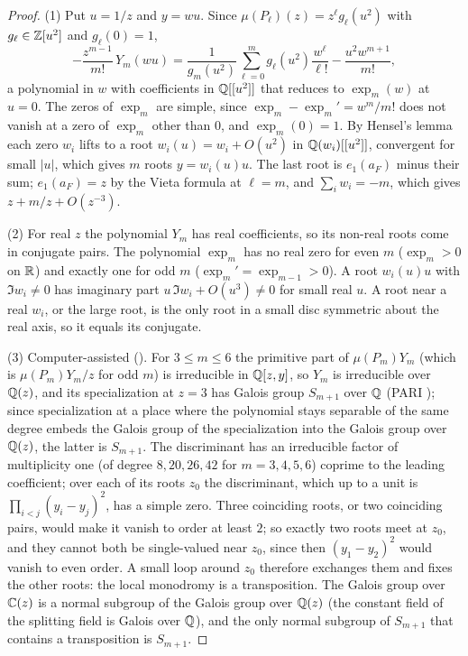 \begin{proof}
(1) Put $u=1/z$ and $y=wu$. Since $\mu(P_\ell)(z)=z^{\ell}g_\ell(u^{2})$ with $g_\ell\in\mathbb{Z}[u^{2}]$ and $g_\ell(0)=1$,
\[
-\frac{z^{m-1}}{m!}\,Y_m(wu)=\frac{1}{g_m(u^{2})}\sum_{\ell=0}^{m}g_\ell(u^{2})\frac{w^{\ell}}{\ell!}-\frac{u^{2}w^{m+1}}{m!},
\]
a polynomial in $w$ with coefficients in $\mathbb{Q}[[u^{2}]]$ that reduces to $\exp_m(w)$ at $u=0$. The zeros of $\exp_m$ are simple, since $\exp_m-\exp_m'=w^{m}/m!$ does not vanish at a zero of $\exp_m$ other than $0$, and $\exp_m(0)=1$. By Hensel's lemma each zero $w_i$ lifts to a root $w_i(u)=w_i+O(u^{2})$ in $\mathbb{Q}(w_i)[[u^{2}]]$, convergent for small $|u|$, which gives $m$ roots $y=w_i(u)u$. The last root is $e_1(a_F)$ minus their sum; $e_1(a_F)=z$ by the Vieta formula at $\ell=m$, and $\sum_iw_i=-m$, which gives $z+m/z+O(z^{-3})$.

(2) For real $z$ the polynomial $Y_m$ has real coefficients, so its non-real roots come in conjugate pairs. The polynomial $\exp_m$ has no real zero for even $m$ ($\exp_m>0$ on $\mathbb{R}$) and exactly one for odd $m$ ($\exp_m'=\exp_{m-1}>0$). A root $w_i(u)u$ with $\Im w_i\neq0$ has imaginary part $u\,\Im w_i+O(u^{3})\neq0$ for small real $u$. A root near a real $w_i$, or the large root, is the only root in a small disc symmetric about the real axis, so it equals its conjugate.

(3) Computer-assisted (). For $3\le m\le6$ the primitive part of $\mu(P_m)Y_m$ (which is $\mu(P_m)Y_m/z$ for odd $m$) is irreducible in $\mathbb{Q}[z,y]$, so $Y_m$ is irreducible over $\mathbb{Q}(z)$, and its specialization at $z=3$ has Galois group $S_{m+1}$ over $\mathbb{Q}$ (PARI ); since specialization at a place where the polynomial stays separable of the same degree embeds the Galois group of the specialization into the Galois group over $\mathbb{Q}(z)$, the latter is $S_{m+1}$. The discriminant has an irreducible factor of multiplicity one (of degree $8,20,26,42$ for $m=3,4,5,6$) coprime to the leading coefficient; over each of its roots $z_0$ the discriminant, which up to a unit is $\prod_{i<j}(y_i-y_j)^2$, has a simple zero. Three coinciding roots, or two coinciding pairs, would make it vanish to order at least $2$; so exactly two roots meet at $z_0$, and they cannot both be single-valued near $z_0$, since then $(y_1-y_2)^2$ would vanish to even order. A small loop around $z_0$ therefore exchanges them and fixes the other roots: the local monodromy is a transposition. The Galois group over $\mathbb{C}(z)$ is a normal subgroup of the Galois group over $\mathbb{Q}(z)$ (the constant field of the splitting field is Galois over $\mathbb{Q}$), and the only normal subgroup of $S_{m+1}$ that contains a transposition is $S_{m+1}$.
\end{proof}

